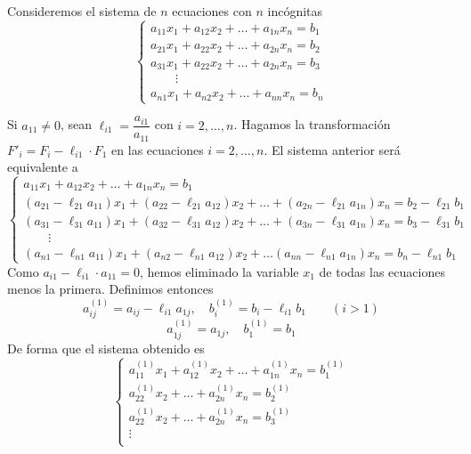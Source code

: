             \begin{met} Consideremos el sistema de $n$ ecuaciones con $n$ incógnitas
            $$\left\{\begin{array}{l}
                 a_{11}x_1+a_{12}x_2+\ldots+a_{1n}x_n=b_1  \\
                 a_{21}x_1+a_{22}x_2+\ldots+a_{2n}x_n=b_2 \\
                  a_{31}x_1+a_{22}x_2+\ldots+a_{2n}x_n=b_3\\
                 \qquad \vdots \\
                 a_{n1}x_1+a_{n2}x_2+\ldots+a_{nn}x_n=b_n
            \end{array}\right.$$
            
            Si $a_{11} \neq 0$, sean $\ell_{i1}=\dfrac{a_{i1}}{a_{11}}$ con $i=2, \ldots, n$. Hagamos la transformación $F'_i=F_i-\ell_{i1}\cdot F_1$ en las ecuaciones $i=2, \ldots, n$. El sistema anterior será equivalente a
            $$\left\{\begin{array}{l}
                 a_{11}x_1+a_{12}x_2+\ldots+a_{1n}x_n=b_1  \\
                 (a_{21}-\ell_{21}a_{11})x_1+(a_{22}-\ell_{21}a_{12})x_2+\ldots+(a_{2n}-\ell_{21}a_{1n})x_n=b_2-\ell_{21}b_1 \\
                 (a_{31}-\ell_{31}a_{11})x_1+ (a_{32}-\ell_{31}a_{12})x_2+\ldots+ (a_{3n}-\ell_{31}a_{1n})x_n=b_3-\ell_{31}b_1\\
                 \qquad \vdots \\
                  (a_{n1}-\ell_{n1}a_{11})x_1+(a_{n2}-\ell_{n1}a_{12})x_2+\ldots(a_{nn}-\ell_{n1}a_{1n})x_n=b_n-\ell_{n1}b_1
            \end{array}\right.$$
           Como $a_{i1}-\ell_{i1}\cdot a_{11}=0$, hemos eliminado la variable $x_1$ de todas las ecuaciones menos la primera. Definimos entonces $$a_{ij}^{(1)}=a_{ij}-\ell_{i1}a_{1j},\quad b_i^{(1)}=b_i-\ell_{i1}b_1 \qquad (i>1)$$
           $$a_{1j}^{(1)}=a_{1j}, \quad b_{1}^{(1)}=b_{1}$$
           De forma que el sistema obtenido es
           $$\left\{\begin{array}{l}
                 a_{11}^{(1)}x_1+a_{12}^{(1)}x_2+\ldots+a_{1n}^{(1)}x_n=b_1^{(1)}  \\
                 a_{22}^{(1)}x_2+\ldots+a_{2n}^{(1)}x_n=b_2^{(1)} \\
                 a_{22}^{(1)}x_2+\ldots+a_{2n}^{(1)}x_n=b_3^{(1)}\\
                 \vdots \\

\end{array}$$
\end{met}
